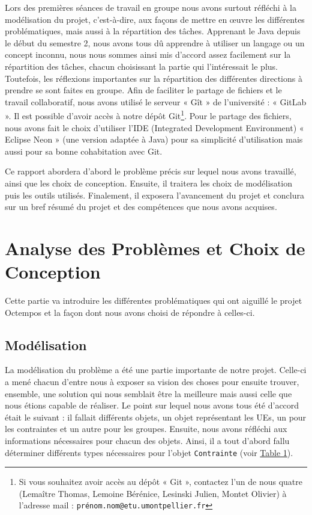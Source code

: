 \documentclass[12pt,a4paper]{article}
\begin{document}
Lors des premières séances de travail en groupe nous avons surtout réfléchi à la modélisation du projet, c’est-à-dire, aux façons de mettre en œuvre les différentes problématiques, mais aussi à la répartition des tâches. Apprenant le Java depuis le début du semestre 2, nous avons tous dû apprendre à utiliser un langage ou un concept inconnu, nous nous sommes ainsi mis d’accord assez facilement sur la répartition des tâches, chacun choisissant la partie qui l’intéressait le plus. Toutefois, les réflexions importantes sur la répartition des différentes directions à prendre se sont faites en groupe. Afin de faciliter le partage de fichiers et le travail collaboratif, nous avons utilisé le serveur « Gît » de l'université : « GitLab ». Il est possible d’avoir accès à notre dépôt Git\footnote{Si vous souhaitez avoir accès au dépôt « Git », contactez l’un de nous quatre (Lemaître Thomas, Lemoine Bérénice, Lesinski Julien, Montet Olivier) à l’adresse mail : \texttt{prénom.nom@etu.umontpellier.fr}}. Pour le partage des fichiers, nous avons fait le choix d’utiliser l'IDE (Integrated Development Environment) « Eclipse Neon » (une version adaptée à Java) pour sa simplicité d’utilisation mais aussi pour sa bonne cohabitation avec Git. 

Ce rapport abordera d'abord le problème précis sur lequel nous avons travaillé, ainsi que les choix de conception. Ensuite, il traitera les choix de modélisation puis les outils utilisés. Finalement, il exposera l'avancement du projet et conclura sur un bref résumé du projet et des compétences que nous avons acquises.

\section{Analyse des Problèmes et Choix de Conception}

Cette partie va introduire les différentes problématiques qui ont aiguillé le projet Octempos et la façon dont nous avons choisi de répondre à celles-ci.  

\subsection{Modélisation}

La modélisation du problème a été une partie importante de notre projet. Celle-ci a mené chacun d'entre nous à exposer sa vision des choses pour ensuite trouver, ensemble, une solution qui nous semblait être la meilleure mais aussi celle que nous étions capable de réaliser. Le point sur lequel nous avons tous été d’accord était le suivant : il fallait différents objets, un objet représentant les UEs, un pour les contraintes et un autre pour les groupes. Ensuite, nous avons réfléchi aux informations nécessaires pour chacun des objets. Ainsi, il a tout d'abord fallu déterminer différents types nécessaires pour l'objet \texttt{Contrainte} (voir \hyperref[typeContrainte]{Table 1}).
\end{document}
